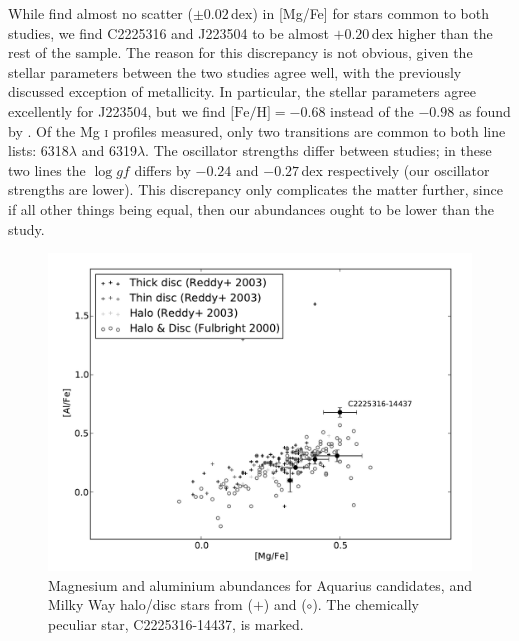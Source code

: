 \documentclass{emulateapj}
\begin{document}
While \citet{wylie-de-boer;et-al_2012} find almost no scatter ($\pm0.02$\,dex) in [Mg/Fe] for stars common to both studies, we find C2225316 and J223504 to be almost $+0.20$\,dex higher than the rest of the sample. The reason for this discrepancy is not obvious, given the stellar parameters between the two studies agree well, with the previously discussed exception of metallicity. In particular, the stellar parameters agree excellently for J223504, but we find $\mbox{[Fe/H]} = -0.68$ instead of the $-0.98$ as found by \citet{wylie-de-boer;et-al_2012}. Of the Mg \textsc{i} profiles measured, only two transitions are common to both line lists: 6318$\lambda$ and 6319$\lambda$. The oscillator strengths differ between studies; in these two lines the $\log{gf}$ differs by $-0.24$ and $-0.27$\,dex respectively (our oscillator strengths are lower). This discrepancy only complicates the matter further, since if all other things being equal, then our abundances ought to be lower than the \citet{wylie-de-boer;et-al_2012} study. 




\begin{figure}[h!]
	\includegraphics[width=\columnwidth]{./figures/aquarius-mg-al.pdf}
	\caption{Magnesium and aluminium abundances for Aquarius candidates, and Milky Way halo/disc stars from \citet{reddy;et-al_2003} ($+$) and \citet{fulbright_2000} ($\circ$). The chemically peculiar star, C2225316-14437, is marked.}
	\label{fig:mg-al}
\end{figure}
\end{document}
